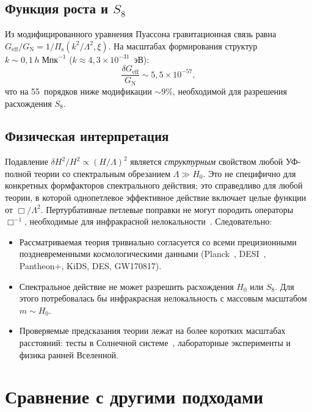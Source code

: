 \documentclass[12pt,a4paper]{article}
\newcommand{\Pis}{\Pi_{\mathrm{s}}}
\newcommand{\Lam}{\Lambda}
\theoremstyle{plain}
\theoremstyle{definition}
\begin{document}
\subsection{Функция роста и \texorpdfstring{$S_8$}{S8}}

Из модифицированного уравнения Пуассона гравитационная связь равна
$G_{\mathrm{eff}}/G_\mathrm{N} = 1/\Pis(k^2/\Lam^2,\xi)$.  На
масштабах формирования структур $k \sim 0{,}1\,h\;\text{Мпк}^{-1}$
($k \approx 4{,}3 \times 10^{-31}$~эВ):
\begin{equation}\label{eq:growth-mod}
  \frac{\delta G_{\mathrm{eff}}}{G_\mathrm{N}}
  \sim 5{,}5 \times 10^{-57},
\end{equation}
что на 55~порядков ниже модификации $\sim 9\%$, необходимой для
разрешения расхождения $S_8$.

\subsection{Физическая интерпретация}

Подавление $\delta H^2/H^2 \propto (H/\Lam)^2$ является
\emph{структурным} свойством любой УФ-полной теории со спектральным
обрезанием $\Lam \gg H_0$.  Это не специфично для конкретных формфакторов
спектрального действия; это справедливо для любой теории, в которой однопетлевое эффективное
действие включает целые функции от $\Box/\Lam^2$.  Пертурбативные
петлевые поправки не могут породить операторы $\Box^{-1}$, необходимые для
инфракрасной нелокальности~\cite{Maggiore:2016gpx}.  Следовательно:
\begin{itemize}[nosep]
  \item Рассматриваемая теория тривиально согласуется со всеми прецизионными поздневременными
    космологическими данными (Planck~\cite{Planck:2018vyg},
    DESI~\cite{DESI:2024}, Pantheon+, KiDS, DES, GW170817).
  \item Спектральное действие не может разрешить расхождения $H_0$ или $S_8$.  Для этого
    потребовалась бы инфракрасная нелокальность с массовым масштабом
    $m \sim H_0$.
  \item Проверяемые предсказания теории лежат на более коротких масштабах
    расстояний: тесты в Солнечной системе~\cite{Alfyorov:2026ss},
    лабораторные эксперименты и физика ранней Вселенной.
\end{itemize}

\section{Сравнение с другими подходами}
\label{sec:comparison}
\end{document}

